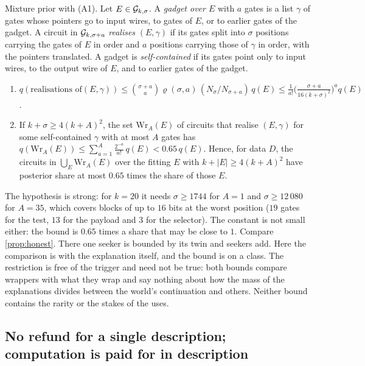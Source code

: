 \begin{proposition}\label{prop:c-gadget}
Mixture prior with (A1). Let $E\in\mathcal G_{k,\sigma}$. A \emph{gadget over $E$} with $a$ gates is a list $\gamma$
of gates whose pointers go to input wires, to gates of $E$, or to earlier gates of the gadget. A circuit in
$\mathcal G_{k,\sigma+a}$ \emph{realises} $(E,\gamma)$ if its gates split into $\sigma$ positions carrying the gates
of $E$ in order and $a$ positions carrying those of $\gamma$ in order, with the pointers translated. A gadget
is \emph{self-contained} if its gates point only to input wires, to the output wire of $E$, and to earlier
gates of the gadget.
\begin{enumerate}[label=(\alph*),leftmargin=2em,itemsep=2pt,topsep=2pt]
\item $q(\text{realisations of
}(E,\gamma))\le\binom{\sigma+a}{a}\varrho(\sigma,a)\,(N_\sigma/N_{\sigma+a})\,q(E)
\le\frac1{a!}\bigl(\frac{\sigma+a}{16(k+\sigma)^2}\bigr)^aq(E)$.
\item If $k+\sigma\ge4(k+A)^2$, the set $\mathrm{Wr}_A(E)$ of circuits that realise $(E,\gamma)$ for some
self-contained $\gamma$ with at most $A$ gates has
$q(\mathrm{Wr}_A(E))\le\sum_{a=1}^{A}\frac{2^{-a}}{a!}\,q(E)<0.65\,q(E)$. Hence, for data $D$, the circuits in
$\bigcup_E\mathrm{Wr}_A(E)$ over the fitting $E$ with $k+|E|\ge4(k+A)^2$ have posterior share at most $0.65$
times the share of those $E$.
\end{enumerate}
\end{proposition}

The hypothesis is strong: for $k=20$ it needs $\sigma\ge1744$ for $A=1$ and $\sigma\ge12\,080$ for $A=35$,
which covers blocks of up to $16$ bits at the worst position ($19$ gates for the test, $13$ for the payload
and $3$ for the selector). The constant is not small either: the bound is $0.65$ times a share that may be
close to $1$. Compare \cref{prop:honest}. There one seeker is bounded by its twin and seekers add. Here the
comparison is with the explanation itself, and the bound is on a class. The restriction is free of the trigger
and need not be true: both bounds compare wrappers with what they wrap and say nothing about how the mass of
the explanations divides between the world's continuation and others. Neither bound contains the rarity or the
stakes of the uses.

\subsection{No refund for a single description; computation is paid for in description}

